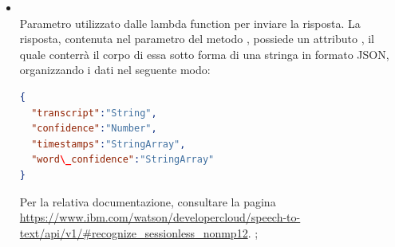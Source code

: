 \begin{itemize}
\begin{itemize}
\begin{itemize}
\begin{lstlisting}[language=json,firstnumber=1]
}
\end{lstlisting};
			\item {} \\
			Parametro utilizzato dalle lambda function per inviare la risposta. La risposta, contenuta nel  parametro del metodo , possiede un attributo , il quale conterrà il corpo di essa sotto forma di una stringa in formato JSON, organizzando i dati nel seguente modo:
\begin{lstlisting}[language=json,firstnumber=1]
{
  "transcript":"String",
  "confidence":"Number",
  "timestamps":"StringArray",
  "word\_confidence":"StringArray"
}
\end{lstlisting}
Per la relativa documentazione, consultare la pagina \url{https://www.ibm.com/watson/developercloud/speech-to-text/api/v1/#recognize\_sessionless\_nonmp12}.
;
		\end{itemize}
	\end{itemize}
\end{itemize}

